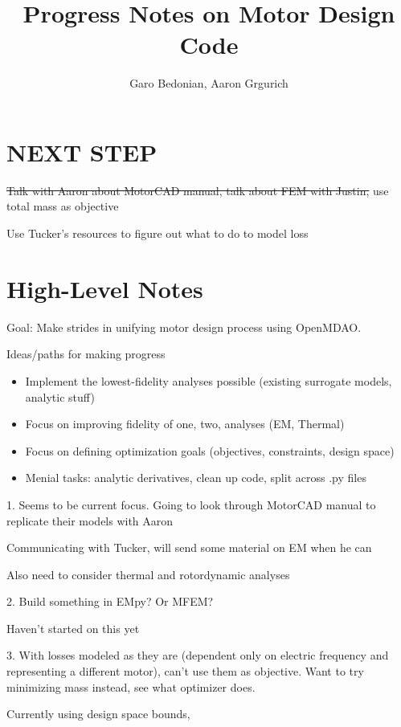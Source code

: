 \documentclass[10pt]{article}
\begin{document}
\title{Progress Notes on Motor Design Code}
\author{Garo Bedonian, Aaron Grgurich}

\maketitle

\section{NEXT STEP}

\sout{Talk with Aaron about MotorCAD manual, talk about FEM with Justin,} use total mass as objective

Use Tucker's resources to figure out what to do to model loss

\section{High-Level Notes}

Goal: Make strides in unifying motor design process using OpenMDAO.

Ideas/paths for making progress 
\begin{itemize}
	\item Implement the lowest-fidelity analyses possible (existing surrogate models, analytic stuff)
	\item Focus on improving fidelity of one, two, analyses (EM, Thermal)
	\item Focus on defining optimization goals (objectives, constraints, design space)
  \item Menial tasks: analytic derivatives, clean up code, split across .py files
\end{itemize}

1. 
Seems to be current focus.
Going to look through MotorCAD manual to replicate their models with Aaron

Communicating with Tucker, will send some material on EM when he can

Also need to consider thermal and rotordynamic analyses

2.
Build something in EMpy?
Or MFEM?

Haven't started on this yet


3.
With losses modeled as they are (dependent only on electric frequency and representing a different motor), can't use them as objective.
Want to try minimizing mass instead, see what optimizer does.

Currently using design space bounds,
\end{document}
